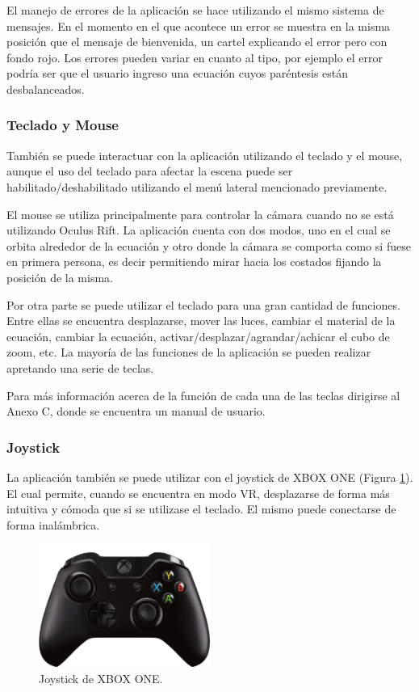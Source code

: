 \documentclass[12pt]{article}
\begin{document}
El manejo de errores de la aplicación se hace utilizando el mismo sistema de mensajes. En el momento en el que acontece un error se muestra en la misma posición que el mensaje de bienvenida, un cartel explicando el error pero con fondo rojo. Los errores pueden variar en cuanto al tipo, por ejemplo el error podría ser que el usuario ingreso una ecuación cuyos paréntesis están desbalanceados.
\subsubsection{Teclado y Mouse}
\noindent También se puede interactuar con la aplicación utilizando el teclado y el mouse, aunque el uso del teclado para afectar la escena puede ser habilitado/deshabilitado utilizando el menú lateral mencionado previamente.

El mouse se utiliza principalmente para controlar la cámara cuando no se está utilizando Oculus Rift. La aplicación cuenta con dos modos, uno en el cual se orbita alrededor de la ecuación y otro donde la cámara se comporta como si fuese en primera persona, es decir permitiendo mirar hacia los costados fijando la posición de la misma.

Por otra parte se puede utilizar el teclado para una gran cantidad de funciones. Entre ellas se encuentra desplazarse, mover las luces, cambiar el material de la ecuación, cambiar la ecuación, activar/desplazar/agrandar/achicar el cubo de zoom, etc. La mayoría de las funciones de la aplicación se pueden realizar apretando una serie de teclas.

Para más información acerca de la función de cada una de las teclas dirigirse al Anexo C, donde se encuentra un manual de usuario.


\subsubsection{Joystick}
\noindent La aplicación también se puede utilizar con el joystick de XBOX ONE (Figura \ref{xbox}). El cual permite, cuando se encuentra en modo VR, desplazarse de forma más intuitiva y cómoda que si se utilizase el teclado. El mismo puede conectarse de forma inalámbrica.\\
\begin{figure}[h!]
\includegraphics[width=0.5\textwidth,center]{joystickPosta.png}
\caption{Joystick de XBOX ONE.}
\label{xbox}
\end{figure}
\end{document}
